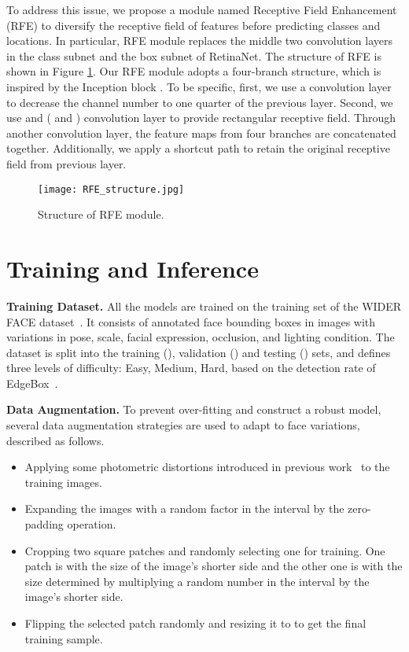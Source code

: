 \documentclass[letterpaper]{article} \usepackage{aaai19m}  \usepackage{times}  \usepackage{helvet}  \usepackage{courier}  \usepackage{url}  \usepackage{graphicx}  \usepackage{subfigure}
\begin{document}
To address this issue, we propose a module named Receptive Field Enhancement (RFE) to diversify the receptive field of features before predicting classes and locations. In particular, RFE module replaces the middle two convolution layers in the class subnet and the box subnet of RetinaNet. The structure of RFE is shown in Figure \ref{fig:rfe}. Our RFE module adopts a four-branch structure, which is inspired by the Inception block \cite{DBLP:conf/cvpr/SzegedyLJSRAEVR15}. To be specific, first, we use a  convolution layer to decrease the channel number to one quarter of the previous layer. Second, we use  and  ( and ) convolution layer to provide rectangular receptive field. Through another  convolution layer, the feature maps from four branches are concatenated together. Additionally, we apply a shortcut path to retain the original receptive field from previous layer.

\begin{figure}[t!]
\centering
\texttt{[image: RFE\_structure.jpg]}
\caption{Structure of RFE module.}
\label{fig:rfe}
\end{figure}


\section{Training and Inference}

{\flushleft \textbf{Training Dataset.} }
All the models are trained on the training set of the WIDER FACE dataset~\cite{DBLP:conf/cvpr/YangLLT16}. It consists of  annotated face bounding boxes in  images with variations in pose, scale, facial expression, occlusion, and lighting condition. The dataset is split into the training (), validation () and testing () sets, and defines three levels of difficulty: Easy, Medium, Hard, based on the detection rate of EdgeBox~\cite{DBLP:conf/eccv/ZitnickD14}.

{\flushleft \textbf{Data Augmentation.} }
To prevent over-fitting and construct a robust model, several data augmentation strategies are used to adapt to face variations, described as follows.
\begin{itemize}
\item[1)] Applying some photometric distortions introduced in previous work~\cite{DBLP:journals/corr/Howard13} to the training images.
\item[2)] Expanding the images with a random factor in the interval  by the zero-padding operation.
\item[3)] Cropping two square patches and randomly selecting one for training. One patch is with the size of the image's shorter side and the other one is with the size determined by multiplying a random number in the interval  by the image's shorter side.
\item[4)] Flipping the selected patch randomly and resizing it to  to get the final training sample.
\end{itemize}
\end{document}

